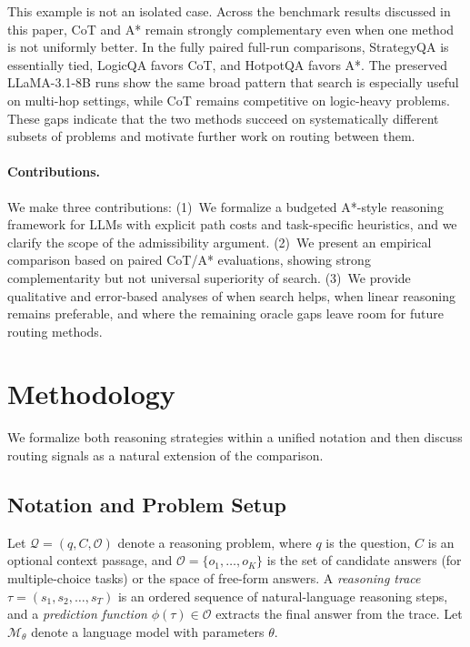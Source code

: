 \documentclass[11pt]{article}
\begin{document}
This example is not an isolated case. Across the benchmark results discussed in this paper, CoT and A* remain strongly complementary even when one method is not uniformly better. In the fully paired full-run comparisons, StrategyQA is essentially tied, LogicQA favors CoT, and HotpotQA favors A*. The preserved LLaMA-3.1-8B runs show the same broad pattern that search is especially useful on multi-hop settings, while CoT remains competitive on logic-heavy problems. These gaps indicate that the two methods succeed on systematically different subsets of problems and motivate further work on routing between them.

\paragraph{Contributions.} We make three contributions: (1)~We formalize a budgeted A*-style reasoning framework for LLMs with explicit path costs and task-specific heuristics, and we clarify the scope of the admissibility argument. (2)~We present an empirical comparison based on paired CoT/A* evaluations, showing strong complementarity but not universal superiority of search. (3)~We provide qualitative and error-based analyses of when search helps, when linear reasoning remains preferable, and where the remaining oracle gaps leave room for future routing methods.

\section{Methodology}
\label{sec:method}

We formalize both reasoning strategies within a unified notation and then discuss routing signals as a natural extension of the comparison.

\subsection{Notation and Problem Setup}

Let $\mathcal{Q} = (q, C, \mathcal{O})$ denote a reasoning problem, where $q$ is the question, $C$ is an optional context passage, and $\mathcal{O} = \{o_1, \ldots, o_K\}$ is the set of candidate answers (for multiple-choice tasks) or the space of free-form answers. A \emph{reasoning trace} $\tau = (s_1, s_2, \ldots, s_T)$ is an ordered sequence of natural-language reasoning steps, and a \emph{prediction function} $\phi(\tau) \in \mathcal{O}$ extracts the final answer from the trace. Let $\mathcal{M}_\theta$ denote a language model with parameters $\theta$.
\end{document}
